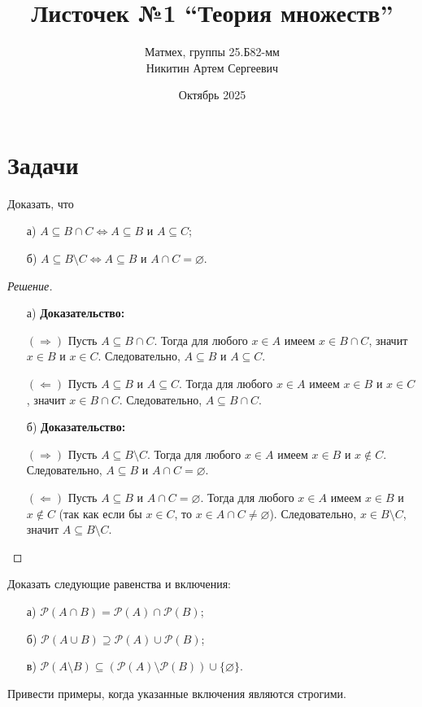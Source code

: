 \documentclass{article}
\title{Листочек №1 ``Теория множеств''}
\author{Матмех, группы 25.Б82-мм \\ Никитин Артем Сергеевич}
\date{Октябрь 2025}
\begin{document}
\maketitle

\section{Задачи}

\begin{task}[1]
Доказать, что
\begin{enumerate}
    \item[а)] $A \subseteq B \cap C \iff A \subseteq B$ и $A \subseteq C$;
    \item[б)] $A \subseteq B \setminus C \iff A \subseteq B$ и $A \cap C = \varnothing$.
\end{enumerate}
\end{task}

\begin{proof}[Решение]\
\begin{enumerate}
    \item[а)] \textbf{Доказательство:}
    
    $(\Rightarrow)$ Пусть $A \subseteq B \cap C$. Тогда для любого $x \in A$ имеем $x \in B \cap C$, значит $x \in B$ и $x \in C$. Следовательно, $A \subseteq B$ и $A \subseteq C$.
    
    $(\Leftarrow)$ Пусть $A \subseteq B$ и $A \subseteq C$. Тогда для любого $x \in A$ имеем $x \in B$ и $x \in C$, значит $x \in B \cap C$. Следовательно, $A \subseteq B \cap C$.
    
    \item[б)] \textbf{Доказательство:}
    
    $(\Rightarrow)$ Пусть $A \subseteq B \setminus C$. Тогда для любого $x \in A$ имеем $x \in B$ и $x \notin C$. Следовательно, $A \subseteq B$ и $A \cap C = \varnothing$.
    
    $(\Leftarrow)$ Пусть $A \subseteq B$ и $A \cap C = \varnothing$. Тогда для любого $x \in A$ имеем $x \in B$ и $x \notin C$ (так как если бы $x \in C$, то $x \in A \cap C \neq \varnothing$). Следовательно, $x \in B \setminus C$, значит $A \subseteq B \setminus C$.
\end{enumerate}
\end{proof}

\begin{task}[2]
Доказать следующие равенства и включения:
\begin{enumerate}
    \item[а)] $\mathcal{P}(A \cap B) = \mathcal{P}(A) \cap \mathcal{P}(B)$;
    \item[б)] $\mathcal{P}(A \cup B) \supseteq \mathcal{P}(A) \cup \mathcal{P}(B)$;
    \item[в)] $\mathcal{P}(A \setminus B) \subseteq (\mathcal{P}(A) \setminus \mathcal{P}(B)) \cup \{\varnothing\}$.
\end{enumerate}
Привести примеры, когда указанные включения являются строгими.
\end{task}
\end{document}
